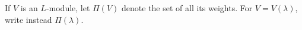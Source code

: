 If $V$ is an $L$-module, let $\Pi(V)$ denote the set of all its weights. For $V = V(\lambda)$, write instead $\Pi(\lambda)$.
